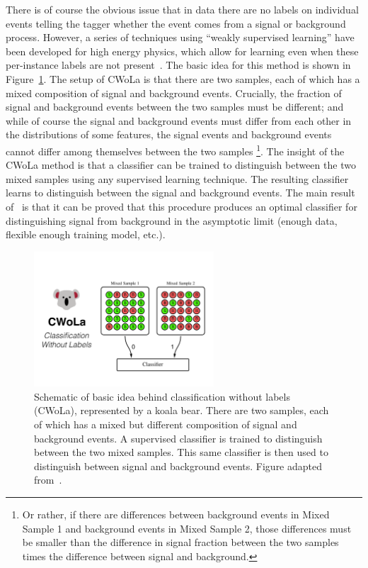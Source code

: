 There is of course the obvious issue that in data there are no labels on individual events telling the tagger whether the event comes from a signal or background process.
However, a series of techniques using ``weakly supervised learning'' have been developed for high energy physics, which allow for learning even when these per-instance labels are not present~\cite{Metodiev:2017vrx,Dery:2017fap,Cohen:2017exh,Komiske:2018oaa}.
The basic idea for this method is shown in Figure~\ref{fig:CWoLa:cwolasetup}.
The setup of CWoLa is that there are two samples, each of which has a mixed composition of signal and background events.
Crucially, the fraction of signal and background events between the two samples must be different; and while of course the signal and background events must differ from each other in the distributions of some features, the signal events and background events cannot differ among themselves between the two samples
\footnote{
Or rather, if there are differences between background events in Mixed Sample 1 and background events in Mixed Sample 2, those differences must be smaller than the difference in signal fraction between the two samples times the difference between signal and background.  
}.
The insight of the CWoLa method is that a classifier can be trained to distinguish between the two mixed samples using any supervised learning technique.
The resulting classifier learns to distinguish between the signal and background events.
The main result of~\cite{Metodiev:2017vrx} is that it can be proved that this procedure produces an optimal classifier for distinguishing signal from background in the asymptotic limit (enough data, flexible enough training model, etc.).

\begin{figure}
\centering
\includegraphics[width=0.6\textwidth]{figures_CWoLa/cwola.pdf}
\caption{
  Schematic of basic idea behind classification without labels (CWoLa), represented by a koala bear.
  There are two samples, each of which has a mixed but different composition of signal and background events.
  A supervised classifier is trained to distinguish between the two mixed samples.
  This same classifier is then used to distinguish between signal and background events.
  Figure adapted from~\cite{Metodiev:2017vrx}.
}
\label{fig:CWoLa:cwolasetup}
\end{figure}

